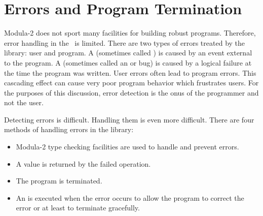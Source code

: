 %
%
%
%

\chapter{Errors and Program  Termination}
\label{IOErrorsChapter}
\label{ErrorsChapter}

Modula-2 does not sport many facilities for building robust
programs.  Therefore, error handling in the \library\ is limited.
There are two types of errors treated by the library:
user and program.  A  (sometimes called )
is caused by an event external to the program.  A 
(sometimes called an  or {bug}) is 
caused by a logical failure at the time the program was written.
User errors often lead to program errors.  This cascading
effect can cause very poor program behavior which frustrates
users.  For the purposes of this discussion, error detection
is the onus of the programmer and not the user.

Detecting errors is difficult.  Handling them is even more
difficult.  There are four methods of handling errors in the library:
\begin{itemize}
\item   
    Modula-2 type checking facilities are used to handle and
    prevent errors.
\item
    A value is returned by the failed operation.
\item    
    The program is terminated.
\item
    An  is executed when the error occurs to 
    allow the program to correct the error or at least to 
    terminate gracefully.
\end{itemize}

